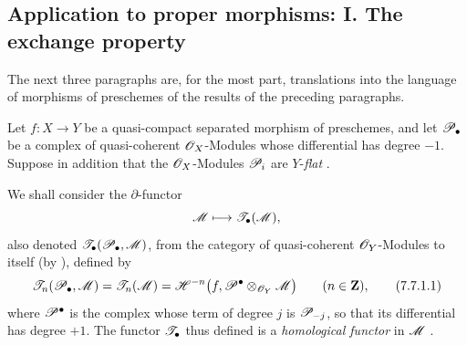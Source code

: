 \subsection{Application to proper morphisms: I. The exchange property}
\label{subsection:III.7.7}
\label{III.7.7}

The next three paragraphs are, for the most part,
translations into the language of morphisms of preschemes
of the results of the preceding paragraphs.

\begin{env}[7.7.1]
\label{III.7.7.1}
Let $f:X\to Y$ be a quasi-compact separated morphism of
preschemes, and let $\mathscr{P}_\bullet$ be a complex of
quasi-coherent $\mathscr{O}_X$-Modules whose differential has
degree $-1$.  Suppose in addition that the $\mathscr{O}_X$-Modules
$\mathscr{P}_i$ are $Y$-\emph{flat} .

We shall consider the $\partial$-functor
\[
  \mathscr{M}\longmapsto\mathscr{T}_\bullet(\mathscr{M}),
\]
also denoted
$\mathscr{T}_\bullet(\mathscr{P}_\bullet,\mathscr{M})$, from the category of
quasi-coherent $\mathscr{O}_Y$-Modules to itself (by
), defined by
\[
  \mathscr{T}_n(\mathscr{P}_\bullet,\mathscr{M})
  =\mathscr{T}_n(\mathscr{M})
  =\mathscr{H}^{-n}
    \bigl(f,\mathscr{P}^\bullet\otimes_{\mathscr{O}_Y}\mathscr{M}\bigr)
  \qquad(n\in\mathbf{Z}),
  \tag{7.7.1.1}\label{III.7.7.1.1}
\]
where $\mathscr{P}^\bullet$ is the complex whose term of degree
$j$ is $\mathscr{P}_{-j}$, so that its differential has degree
$+1$.  The functor $\mathscr{T}_\bullet$ thus defined is a
\emph{homological functor} in $\mathscr{M}$ .
\end{env}

